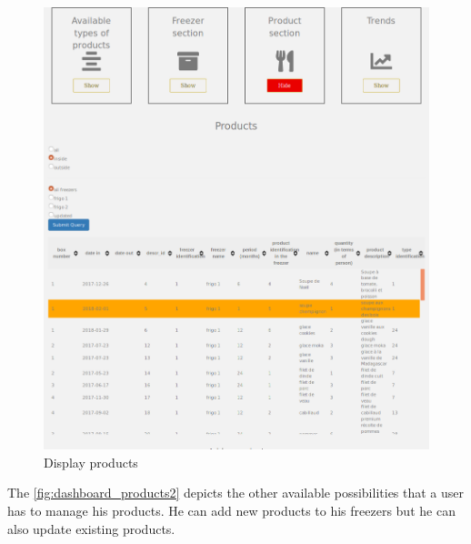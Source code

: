 \begin{figure}[H]
\centering
\includegraphics[scale=0.3]{./images/dashboard_products1.png}
\caption{Display products}
\label{fig:dashboard_products1}
\end{figure}

The \autoref{fig:dashboard_products2} depicts the other available possibilities that a user has to manage his products. He can add new products to his freezers but he can also update existing products.

